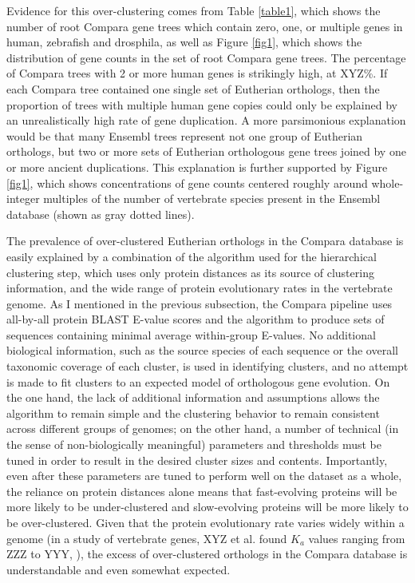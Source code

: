 Evidence for this over-clustering comes from Table \ref{table1}, which
shows the number of root Compara gene trees which contain zero, one,
or multiple genes in human, zebrafish and drosphila, as well as Figure
\ref{fig1}, which shows the distribution of gene counts in the set of
root Compara gene trees. The percentage of Compara trees with 2 or
more human genes is strikingly high, at XYZ\%. If each Compara tree
contained one single set of Eutherian orthologs, then the proportion
of trees with multiple human gene copies could only be explained by an
unrealistically high rate of gene duplication. A more parsimonious
explanation would be that many Ensembl trees represent not one group
of Eutherian orthologs, but two or more sets of Eutherian orthologous
gene trees joined by one or more ancient duplications. This
explanation is further supported by Figure \ref{fig1}, which shows
concentrations of gene counts centered roughly around whole-integer
multiples of the number of vertebrate species present in the Ensembl
database (shown as gray dotted lines).

The prevalence of over-clustered Eutherian orthologs in the Compara
database is easily explained by a combination of the \hclust algorithm
used for the hierarchical clustering step, which uses only protein
distances as its source of clustering information, and the wide range
of protein evolutionary rates in the vertebrate genome. As I mentioned
in the previous subsection, the Compara pipeline uses all-by-all
protein BLAST E-value scores and the \hclust algorithm to produce sets
of sequences containing minimal average within-group E-values. No
additional biological information, such as the source species of each
sequence or the overall taxonomic coverage of each cluster, is used in
identifying clusters, and no attempt is made to fit clusters to an
expected model of orthologous gene evolution. On the one hand, the
lack of additional information and assumptions allows the algorithm to
remain simple and the clustering behavior to remain consistent across
different groups of genomes; on the other hand, a number of technical
(in the sense of non-biologically meaningful) parameters and
thresholds must be tuned in order to result in the desired cluster
sizes and contents. Importantly, even after these parameters are tuned
to perform well on the dataset as a whole, the reliance on protein
distances alone means that fast-evolving proteins will be more likely
to be under-clustered and slow-evolving proteins will be more likely
to be over-clustered. Given that the protein evolutionary rate varies
widely within a genome (in a study of vertebrate genes, XYZ et
al. found $K_a$ values ranging from ZZZ to YYY, \todo), the excess of
over-clustered orthologs in the Compara database is understandable and
even somewhat expected.

